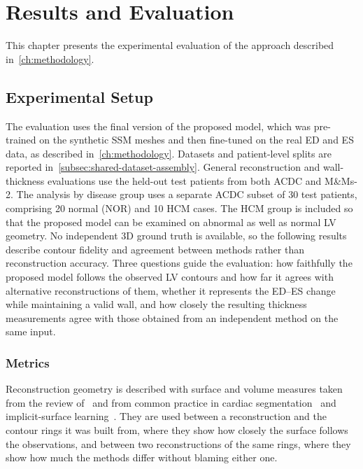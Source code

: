 \chapter{Results and Evaluation}
\label{ch:results}

\noindent This chapter presents the experimental evaluation of the approach
described in~\cref{ch:methodology}.

\section{Experimental Setup}
\label{sec:setup}
\noindent
The evaluation uses the final version of the proposed model, which was pre-trained on the synthetic
SSM meshes and then fine-tuned on the real ED and ES data, as described in~\cref{ch:methodology}. Datasets
and patient-level splits are reported in~\cref{subsec:shared-dataset-assembly}.
General reconstruction and wall-thickness evaluations use the held-out test
patients from both ACDC and M\&Ms-2. The analysis by disease group
uses a separate ACDC subset of 30 test patients, comprising 20 normal (NOR)
and 10 HCM cases. The HCM group is included so
that the proposed model can be examined on abnormal as well as normal LV geometry. No
independent 3D ground truth is available, so the following results describe
contour fidelity and agreement between methods rather than reconstruction
accuracy. Three questions guide the evaluation: how faithfully the proposed model
follows the observed LV contours and how far it agrees with alternative
reconstructions of them, whether it represents the ED--ES change while
maintaining a valid wall, and how closely the resulting thickness measurements
agree with those obtained from an independent method on the same input.

\subsection{Metrics}
\label{subsec:metrics}
\noindent
Reconstruction geometry is described with surface and volume measures taken
from the review of~\textcite{taha2015metrics} and from common practice in
cardiac segmentation~\parencite{bernard2018acdc} and implicit-surface
learning~\parencite{occupancynetworks2019}. They are used between a
reconstruction and the contour rings it was built from, where they show how
closely the surface follows the observations, and between two reconstructions
of the same rings, where they show how much the methods differ without
blaming either one.

